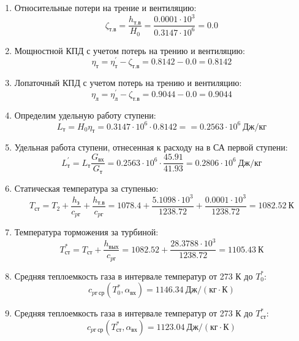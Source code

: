 \documentclass[a4paper,12pt]{article}
\begin{document}
\begin{enumerate}
        \item Относительные потери на трение и вентиляцию:
        \[
            \zeta_{т.в} = \frac{ h_{т.в} }{ H_0 } =
                \frac{ 0.0001 \cdot 10^3 }{ 0.3147 \cdot 10^6 } =
            0.0
        \]

        \item Мощностной КПД с учетом потерь на трению и вентиляцию:
        \[
            \eta_т = \eta_т^\prime - \zeta_{т.в} =
                0.8142 - 0.0 =
            0.8142
        \]

        \item Лопаточный КПД с учетом потерь на трению и вентиляцию:
        \[
            \eta_л = \eta_л^\prime - \zeta_{т.в} =
                0.9044 - 0.0 =
            0.9044
        \]

        \item Определим удельную работу ступени:
        \[
            L_т = H_0 \eta_т = 0.3147 \cdot 10^6 \cdot 0.8142 =
            = 0.2563 \cdot 10^6 \ Дж/кг
        \]

        \item Удельная работа ступени, отнесенная к расходу на в СА первой ступени:
        \[
            L_т^\prime = L_т \frac{ G_{вх} }{ G_т }  =
                0.2563 \cdot 10^6 \cdot
                \frac{ 45.91 }{ 41.93 } =
            0.2806 \cdot 10^6 \ Дж/кг
        \]

        \item Статическая температура за ступенью:
        \[
            T_{ст} = T_2 + \frac{ h_з }{ c_{pг} } + \frac{ h_{т.в} }{ c_{pг} } =
                1078.4 +
                \frac{5.1098 \cdot 10^3 }{ 1238.72 } +
                \frac{ 0.0001 \cdot 10^3 }{ 1238.72 } =
            1082.52 \ К
        \]

        \item Температура торможения за турбиной:
        \[
            T_{ст}^* = T_{ст} + \frac{ h_{вых} }{ c_{pг} } =
                1082.52 +
                \frac{ 28.3788 \cdot 10^3 }{ 1238.72 } =
            1105.43 \ К
        \]

        \item Средняя теплоемкость газа в интервале температур от 273 К до $T_0^*$:
        \[
            c_{pг\ ср} (T_0^*, \alpha_{вх}) =
            1146.34 \ Дж/(кг \cdot К)
        \]

        \item Средняя теплоемкость газа в интервале температур от 273 К до $T_{ст}^*$:
        \[
            c_{pг\ ср} (T_{ст}^*, \alpha_{вх}) =
            1123.04 \ Дж/(кг \cdot К)
        \]


\end{enumerate}
\end{document}

